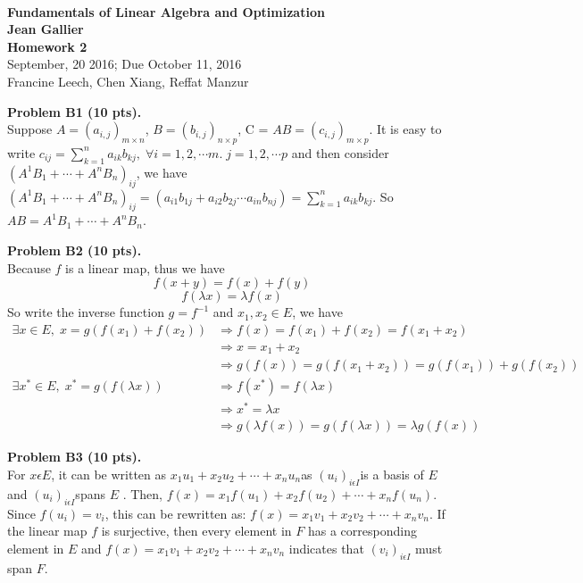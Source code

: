 \documentclass[12pt]{article}
\begin{document}
\begin{center}
\\
\vspace{1cm}
{\Large\bf Fundamentals of Linear Algebra and Optimization\\
Jean Gallier \\
\vspace{0.5cm}
Homework 2}\\[10pt]
September, 20 2016; Due October 11, 2016\\
Francine Leech, Chen Xiang, Reffat Manzur
\end{center}


\vspace {0.25cm}\noindent
{\bf Problem B1 (10 pts).} \\
Suppose $A = (a_{i,j})_{m \times n}$, $B = (b_{i,j})_{n \times p}$, C = $AB = (c_{i,j})_{m \times p}$.
It is easy to write $c_{ij} = \sum_{k=1}^{n} a_{ik} b_{kj},\; \forall i = 1,2,\cdots m.\; j = 1,2,\cdots p$ 
and then consider $(A^1B_1 + \cdots + A^nB_n)_{ij}$, we have $  (A^1B_1 + \cdots + A^nB_n)_{ij} = (a_{i1}b_{1j} + a_{i2}b_{2j} \cdots a_{in}b_{nj}) = \sum_{k=1}^{n} a_{ik} b_{kj}$. So $AB = A^1B_1 + \cdots + A^nB_n$.

\medskip
\vspace {0.25cm}\noindent
{\bf Problem B2 (10 pts).} \\
Because $f$ is a linear map, thus we have 
\[
f(x + y) = f(x) + f(y)
\]
\[
f(\lambda x) = \lambda f(x)
\]
So write the inverse function $g = f^{-1}$ and $x_1,x_2 \in E$, we have 
\begin{align*}
\exists x \in E , \; x = g(f(x_1) + f(x_2)) &\Rightarrow 
f(x) = f(x_1) + f(x_2) = f(x_1 + x_2) \\
&\Rightarrow x = x_1 + x_2 \\
&\Rightarrow g(f(x)) = g(f(x_1 + x_2)) = g(f(x_1)) + g(f(x_2)) \\
\exists x^* \in E, \; x^* = g(f(\lambda x)) &\Rightarrow f(x^*) = f(\lambda x) \\
&\Rightarrow x^* = \lambda x \\
&\Rightarrow g(\lambda f(x)) = g(f(\lambda x)) = \lambda g(f(x))
\end{align*}



\vspace {0.25cm}\noindent
{\bf Problem B3 (10 pts).} \\
For $x\epsilon E$, it can be written as $x_{1}u_{1}+x_{2}u_{2}+\cdots+x_{n}u_{n}$as
$(u_{i})_{i\epsilon I}$is a basis of $E$ and $(u_{i})_{i\epsilon I}$spans
$E$ . Then, $f(x)=x_{1}f(u_{1})+x_{2}f(u_{2})+\cdots+x_{n}f(u_{n})$.
Since $f(u_{i})=v_{i}$, this can be rewritten as: $f(x)=x_{1}v_{1}+x_{2}v_{2}+\cdots+x_{n}v_{n}$.
If the linear map $f$ is surjective, then every element in $F$ has
a corresponding element in $E$ and $f(x)=x_{1}v_{1}+x_{2}v_{2}+\cdots+x_{n}v_{n}$
indicates that $(v_{i})_{i\epsilon I}$ must span $F$.\\
\end{document}
